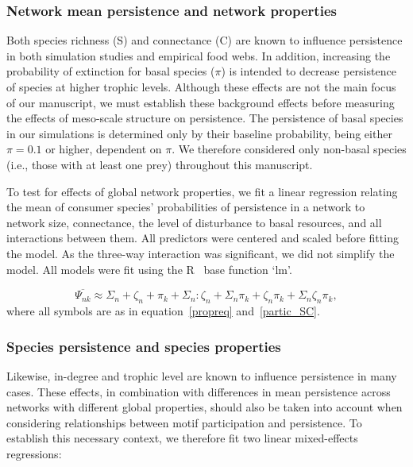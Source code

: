 \documentclass[12pt]{article}
\begin{document}
\begin{spacing}{2.0}
        \subsubsection{Network mean persistence and network properties}
    
            Both species richness (S) and connectance (C) are known to influence persistence in both simulation studies and empirical food webs.
            In addition, increasing the probability of extinction for basal species ($\pi$) is intended to decrease persistence of species at higher trophic levels.
            Although these effects are not the main focus of our manuscript, we must establish these background effects before measuring the effects of meso-scale structure on persistence.
            The persistence of basal species in our simulations is determined only by their baseline probability, being either $\pi = 0.1$ or higher, dependent on $\pi$.
            We therefore considered only non-basal species (i.e., those with at least one prey) throughout this manuscript.

            To test for effects of global network properties, we fit a linear regression relating the mean of consumer species' probabilities of persistence in a network to network size, connectance, the level of disturbance to basal resources, and all interactions between them. 
            All predictors were centered and scaled before fitting the model. 
            As the three-way interaction was significant, we did not simplify the model.
            All models were fit using the R~\citep{R} base function `lm'.


            \begin{equation}
                \overline{\Psi_{nk}} \approx \Sigma_{n} + \zeta_{n} + \pi_k + \Sigma_{n}:\zeta_{n} + \Sigma_{n}\pi_k + \zeta_{n}\pi_k + \Sigma_{n}\zeta_{n}\pi_k,
                \label{SCeq}
            \end{equation}
            where all symbols are as in equation~\ref{propreq} and~\ref{partic_SC}.
                  

        \subsubsection{Species persistence and species properties}
    
            Likewise, in-degree and trophic level are known to influence persistence in many cases.
            These effects, in combination with differences in mean persistence across networks with different global properties, should also be taken into account when considering relationships between motif participation and persistence.
            To establish this necessary context, we therefore fit two linear mixed-effects regressions:


\end{spacing}
\end{document}

